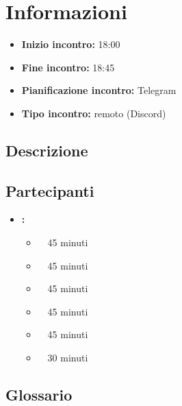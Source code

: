 \section{Informazioni}
\begin{itemize}
	\item \textbf{Inizio incontro:} 18:00
	\item \textbf{Fine incontro:} 18:45
	\item \textbf{Pianificazione incontro:} Telegram
	\item \textbf{Tipo incontro:} remoto (Discord)
\end{itemize}

\subsection{Descrizione}
\DocDescription

\subsection{Partecipanti}

\begin{itemize}
	\item \textbf{\GroupName:}
	\begin{itemize}
		\item \tommaso \ \rightarrow\ 45 minuti
		\item \marco \ \rightarrow\ 45 minuti
		\item \riccardo \ \rightarrow\ 45 minuti
		\item \martina \ \rightarrow\ 45 minuti
		\item \sebastiano \ \rightarrow\ 45 minuti
		\item \mattia \ \rightarrow\ 30 minuti
	\end{itemize}
\end{itemize}

\subsection{Glossario}
\GlossarioIntroduzione

\clearpage